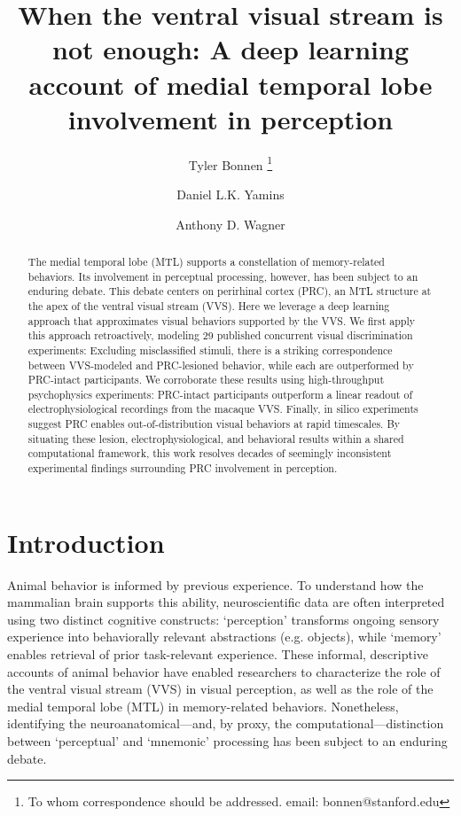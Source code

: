 \documentclass[11pt]{article}
\date{\vspace{-5ex}}
\title{When the ventral visual stream is not enough: A deep learning account of medial temporal lobe involvement in perception}
\author[a]{Tyler Bonnen 
    \thanks{To whom correspondence should be addressed. email: bonnen@stanford.edu}}
\author[a,b,c]{Daniel L.K. Yamins}
\author[a,c]{Anthony D. Wagner}
\affil[a]{\small Department of Psychology, Stanford University}
\affil[b]{Department of Computer Science, Stanford University}
\affil[c]{Wu Tsai Neurosciences Institute, Stanford University}
\begin{document}
\maketitle
\linenumbers
\begin{abstract}
\noindent 
The medial temporal lobe (MTL) supports a constellation of memory-related behaviors. Its involvement in perceptual processing, however, has been subject to an enduring debate. This debate centers on perirhinal cortex (PRC), an MTL structure at the apex of the ventral visual stream (VVS). Here we leverage a deep learning approach that approximates visual behaviors supported by the VVS. We first apply this approach retroactively, modeling 29 published concurrent visual discrimination experiments: Excluding misclassified stimuli, there is a striking correspondence between VVS-modeled and PRC-lesioned behavior, while each are outperformed by PRC-intact participants. We corroborate these results using high-throughput psychophysics experiments: PRC-intact participants outperform a linear readout of electrophysiological recordings from the macaque VVS. Finally, in silico experiments suggest PRC enables out-of-distribution visual behaviors at rapid timescales. By situating these lesion, electrophysiological, and behavioral results within a shared computational framework, this work resolves decades of seemingly inconsistent experimental findings surrounding PRC involvement in perception. 
\end{abstract}

\section{Introduction}
Animal behavior is informed by previous experience\cite{eichenbaum2004conditioning}. To understand how the mammalian brain supports this ability, neuroscientific data are often interpreted using two distinct cognitive constructs: `perception' transforms ongoing sensory experience into behaviorally relevant abstractions (e.g. objects), while `memory' enables retrieval of prior task-relevant experience. These informal, descriptive accounts of animal behavior have enabled researchers to characterize the role of the ventral visual stream (VVS) in visual perception\cite{felleman1991distributed, ullman1996high, dicarlo2012does}, as well as the role of the medial temporal lobe (MTL) in memory-related behaviors\cite{squire1991medial, manns2006evolution, suzuki2004functional}. Nonetheless, identifying the neuroanatomical---and, by proxy, the computational---distinction between ‘perceptual’ and ‘mnemonic’ processing has been subject to an enduring debate\cite{murray2007visual, suzuki2009perception}.
\end{document}
